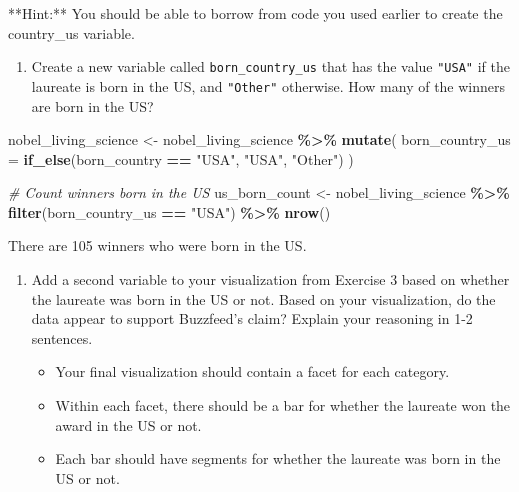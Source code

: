 \documentclass[
]{article}
\newenvironment{Shaded}{\begin{snugshade}}{\end{snugshade}}
\newcommand{\AttributeTok}[1]{\textcolor[rgb]{0.13,0.29,0.53}{#1}}
\newcommand{\CommentTok}[1]{\textcolor[rgb]{0.56,0.35,0.01}{\textit{#1}}}
\newcommand{\FunctionTok}[1]{\textcolor[rgb]{0.13,0.29,0.53}{\textbf{#1}}}
\newcommand{\NormalTok}[1]{#1}
\newcommand{\OtherTok}[1]{\textcolor[rgb]{0.56,0.35,0.01}{#1}}
\newcommand{\SpecialCharTok}[1]{\textcolor[rgb]{0.81,0.36,0.00}{\textbf{#1}}}
\newcommand{\StringTok}[1]{\textcolor[rgb]{0.31,0.60,0.02}{#1}}
\providecommand{\tightlist}{%
  \setlength{\itemsep}{0pt}\setlength{\parskip}{0pt}}
\begin{document}
\begin{Shaded}
\begin{Highlighting}[]
\NormalTok{**Hint:** You should be able to borrow from code you used earlier to create the \textasciigrave{}country\_us\textasciigrave{} variable.}
\end{Highlighting}
\end{Shaded}

\begin{enumerate}
\def\labelenumi{\arabic{enumi}.}
\setcounter{enumi}{3}
\tightlist
\item
  Create a new variable called \texttt{born\_country\_us} that has the
  value \texttt{"USA"} if the laureate is born in the US, and
  \texttt{"Other"} otherwise. How many of the winners are born in the
  US?
\end{enumerate}

\begin{Shaded}
\begin{Highlighting}[]
\NormalTok{nobel\_living\_science }\OtherTok{\textless{}{-}}\NormalTok{ nobel\_living\_science }\SpecialCharTok{\%\textgreater{}\%}
  \FunctionTok{mutate}\NormalTok{(}
    \AttributeTok{born\_country\_us =} \FunctionTok{if\_else}\NormalTok{(born\_country }\SpecialCharTok{==} \StringTok{"USA"}\NormalTok{, }\StringTok{"USA"}\NormalTok{, }\StringTok{"Other"}\NormalTok{)}
\NormalTok{  )}

\CommentTok{\# Count winners born in the US}
\NormalTok{us\_born\_count }\OtherTok{\textless{}{-}}\NormalTok{ nobel\_living\_science }\SpecialCharTok{\%\textgreater{}\%}
  \FunctionTok{filter}\NormalTok{(born\_country\_us }\SpecialCharTok{==} \StringTok{"USA"}\NormalTok{) }\SpecialCharTok{\%\textgreater{}\%}
  \FunctionTok{nrow}\NormalTok{()}
\end{Highlighting}
\end{Shaded}

There are 105 winners who were born in the US.

\begin{enumerate}
\def\labelenumi{\arabic{enumi}.}
\setcounter{enumi}{4}
\item
  Add a second variable to your visualization from Exercise 3 based on
  whether the laureate was born in the US or not. Based on your
  visualization, do the data appear to support Buzzfeed's claim? Explain
  your reasoning in 1-2 sentences.

  \begin{itemize}
  \tightlist
  \item
    Your final visualization should contain a facet for each category.
  \item
    Within each facet, there should be a bar for whether the laureate
    won the award in the US or not.
  \item
    Each bar should have segments for whether the laureate was born in
    the US or not.
  \end{itemize}
\end{enumerate}
\end{document}
